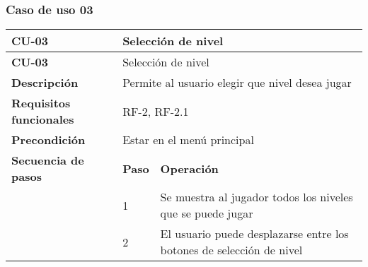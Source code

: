 \subsubsection{Caso de uso 03}
\begin{longtable}{lll}
\textbf{CU-03}                                   & \multicolumn{2}{l}{Selección de nivel}                                                                                                                                                                               \\ \hline
\endfirsthead
\textbf{CU-03}                                   & \multicolumn{2}{l}{Selección de nivel}                                                                                                                                                                               \\ \hline
\endhead
%
\textbf{Descripción}                             & \multicolumn{2}{l}{Permite al usuario elegir que nivel desea jugar}                                                                                                                                                  \\ \hline
\textbf{Requisitos funcionales}                  & \multicolumn{2}{l}{RF-2, RF-2.1}                                                                                                                                                                                     \\ \hline
\textbf{Precondición}                            & \multicolumn{2}{l}{Estar en el menú principal}                                                                                                                                                                       \\ \hline
\multicolumn{1}{l|}{\textbf{Secuencia de pasos}} & \textbf{Paso}                                                          & \textbf{Operación}                                                                                                                          \\ \cline{2-3} 
\multicolumn{1}{l|}{}                            & 1                                                                      & Se muestra al jugador todos los niveles que se puede jugar                                                                                  \\
\multicolumn{1}{l|}{}                            & 2                                                                      & El usuario puede desplazarse entre los botones de selección de nivel                                                                        \\

\end{longtable}
